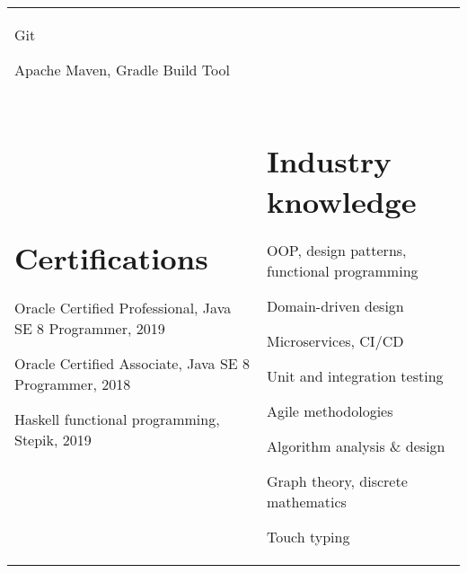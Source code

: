 \documentclass{article}
\begin{document}
\begin{tabular}{p{275pt} p{275pt}}
        Git

        Apache Maven, Gradle Build Tool\\
        \section*{Certifications}
        Oracle Certified Professional, Java SE 8 Programmer, 2019

        Oracle Certified Associate, Java SE 8 Programmer, 2018

        Haskell functional programming, Stepik, 2019
        &
        \section*{Industry knowledge}
        OOP, design patterns, functional programming

        Domain-driven design

        Microservices, CI/CD

        Unit and integration testing

        Agile methodologies

        Algorithm analysis \& design

        Graph theory, discrete mathematics

        Touch typing
    \end{tabular}
\end{document}
